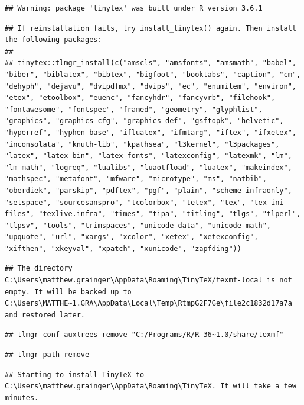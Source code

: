 \documentclass[]{article}
\title{}
\author{}
\date{}
\begin{document}
\begin{verbatim}
## Warning: package 'tinytex' was built under R version 3.6.1
\end{verbatim}

\begin{verbatim}
## If reinstallation fails, try install_tinytex() again. Then install the following packages:
## 
## tinytex::tlmgr_install(c("amscls", "amsfonts", "amsmath", "babel", "biber", "biblatex", "bibtex", "bigfoot", "booktabs", "caption", "cm", "dehyph", "dejavu", "dvipdfmx", "dvips", "ec", "enumitem", "environ", "etex", "etoolbox", "euenc", "fancyhdr", "fancyvrb", "filehook", "fontawesome", "fontspec", "framed", "geometry", "glyphlist", "graphics", "graphics-cfg", "graphics-def", "gsftopk", "helvetic", "hyperref", "hyphen-base", "ifluatex", "ifmtarg", "iftex", "ifxetex", "inconsolata", "knuth-lib", "kpathsea", "l3kernel", "l3packages", "latex", "latex-bin", "latex-fonts", "latexconfig", "latexmk", "lm", "lm-math", "logreq", "lualibs", "luaotfload", "luatex", "makeindex", "mathspec", "metafont", "mfware", "microtype", "ms", "natbib", "oberdiek", "parskip", "pdftex", "pgf", "plain", "scheme-infraonly", "setspace", "sourcesanspro", "tcolorbox", "tetex", "tex", "tex-ini-files", "texlive.infra", "times", "tipa", "titling", "tlgs", "tlperl", "tlpsv", "tools", "trimspaces", "unicode-data", "unicode-math", "upquote", "url", "xargs", "xcolor", "xetex", "xetexconfig", "xifthen", "xkeyval", "xpatch", "xunicode", "zapfding"))
\end{verbatim}

\begin{verbatim}
## The directory C:\Users\matthew.grainger\AppData\Roaming\TinyTeX/texmf-local is not empty. It will be backed up to C:\Users\MATTHE~1.GRA\AppData\Local\Temp\RtmpG2F7Ge\file2c1832d17a7a and restored later.
\end{verbatim}

\begin{verbatim}
## tlmgr conf auxtrees remove "C:/Programs/R/R-36~1.0/share/texmf"
\end{verbatim}

\begin{verbatim}
## tlmgr path remove
\end{verbatim}

\begin{verbatim}
## Starting to install TinyTeX to C:\Users\matthew.grainger\AppData\Roaming\TinyTeX. It will take a few minutes.
\end{verbatim}
\end{document}
